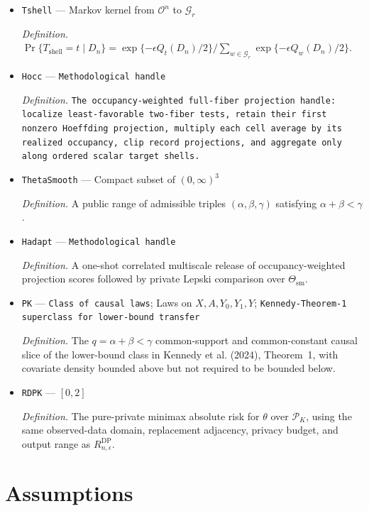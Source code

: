 \documentclass{article}
\begin{document}
\begin{itemize}
  \item \texttt{Tshell} --- Markov kernel from \(\mathcal O^n\) to \(\mathcal G_r\)
  \par\smallskip\noindent\emph{Definition.} \(\Pr\{T_{\mathrm{shell}}=t\mid D_n\}=\exp\{-\epsilon Q_t(D_n)/2\}/\sum_{w\in\mathcal G_r}\exp\{-\epsilon Q_w(D_n)/2\}\).
  \item \texttt{Hocc} --- \texttt{Methodological handle}
  \par\smallskip\noindent\emph{Definition.} \texttt{The occupancy-\allowbreak{}weighted full-\allowbreak{}fiber projection handle:\allowbreak{} localize least-\allowbreak{}favorable two-\allowbreak{}fiber tests,\allowbreak{} retain their first nonzero Hoeffding projection,\allowbreak{} multiply each cell average by its realized occupancy,\allowbreak{} clip record projections,\allowbreak{} and aggregate only along ordered scalar target shells.}
  \item \texttt{ThetaSmooth} --- Compact subset of \((0,\infty)^3\)
  \par\smallskip\noindent\emph{Definition.} A public range of admissible triples \((\alpha,\beta,\gamma)\) satisfying \(\alpha+\beta<\gamma\).
  \item \texttt{Hadapt} --- \texttt{Methodological handle}
  \par\smallskip\noindent\emph{Definition.} A one-shot correlated multiscale release of occupancy-weighted projection scores followed by private Lepski comparison over \(\Theta_{\mathrm{sm}}\).
  \item \texttt{PK} --- \texttt{Class of causal laws}; Laws on \(X,A,Y_0,Y_1,Y\); \texttt{Kennedy-\allowbreak{}Theorem-\allowbreak{}1 superclass for lower-\allowbreak{}bound transfer}
  \par\smallskip\noindent\emph{Definition.} The \(q=\alpha+\beta<\gamma\) common-support and common-constant causal slice of the lower-bound class in Kennedy et al. (2024), Theorem~1, with covariate density bounded above but not required to be bounded below.
  \item \texttt{RDPK} --- \([0,2]\)
  \par\smallskip\noindent\emph{Definition.} The pure-private minimax absolute risk for \(\theta\) over \(\mathcal P_K\), using the same observed-data domain, replacement adjacency, privacy budget, and output range as \(R_{n,\epsilon}^{\mathrm{DP}}\).
\end{itemize}

\section{Assumptions}
\end{document}
